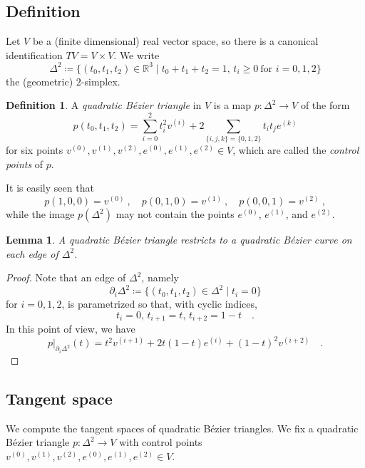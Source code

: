 \documentclass[pdftex,a4paper,12pt]{scrartcl}
\theoremstyle{plain}
\newtheorem{lemma}[theorem]{Lemma}
\theoremstyle{definition}
\newtheorem*{definition}{Definition}
\theoremstyle{remark}
\begin{document}
\subsection{Definition}

Let $V$ be a (finite dimensional) real vector space, so there is a canonical identification $TV=V\times V$.
We write
\[
\Delta^2\coloneqq\{(t_0,t_1,t_2)\in\mathbb R^3\mid t_0+t_1+t_2=1,\,t_i\ge0\ \text{for $i=0,1,2$}\}
\]
the (geometric) $2$-simplex.

\begin{definition}
A \emph{quadratic B\'ezier triangle} in $V$ is a map $p:\Delta^2\to V$ of the form
\[
p(t_0,t_1,t_2)
= \sum_{i=0}^2 t_i^2 v^{(i)}+2\sum_{\{i,j,k\}=\{0,1,2\}} t_i t_je^{(k)}
\]
for six points $v^{(0)},v^{(1)},v^{(2)},e^{(0)},e^{(1)},e^{(2)}\in V$, which are called the \emph{control points} of $p$.
\end{definition}

It is easily seen that
\[
p(1,0,0) = v^{(0)}
\ ,\quad p(0,1,0) = v^{(1)}
\ ,\quad p(0,0,1) = v^{(2)}
\ ,
\]
while the image $p(\Delta^2)$ may not contain the points $e^{(0)}$, $e^{(1)}$, and $e^{(2)}$.

\begin{lemma}
A quadratic B\'ezier triangle restricts to a quadratic B\'ezier curve on each edge of $\Delta^2$.
\end{lemma}
\begin{proof}
Note that an edge of $\Delta^2$, namely
\[
\partial_i\Delta^2\coloneqq \{(t_0,t_1,t_2)\in\Delta^2\mid t_i=0\}
\]
for $i=0,1,2$, is parametrized so that, with cyclic indices,
\[
t_i=0
,\,
t_{i+1}=t
,\,
t_{i+2}=1-t
\quad.
\]
In this point of view, we have
\[
\left.p\right|_{\partial_i\Delta^2}(t)
= t^2v^{(i+1)} + 2t(1-t) e^{(i)} + (1-t)^2 v^{(i+2)}
\quad.
\]
\end{proof}

\subsection{Tangent space}

We compute the tangent spaces of quadratic B\'ezier triangles.
We fix a quadratic B\'ezier triangle $p:\Delta^2\to V$ with control points $v^{(0)},v^{(1)},v^{(2)},e^{(0)},e^{(1)},e^{(2)}\in V$.
\end{document}
